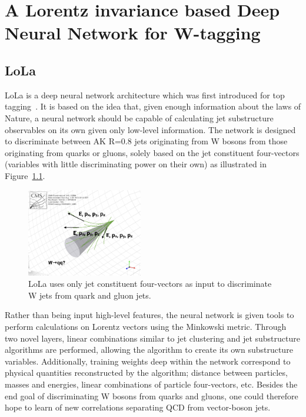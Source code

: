 \chapter{A Lorentz invariance based Deep Neural Network for W-tagging}
\section{LoLa}
LoLa is a deep neural network architecture which was first introduced for top tagging~\cite{Butter:2017cot}. It is based on the idea that, given enough information about the laws of Nature, a neural network should be capable of calculating jet substructure observables on its own given only low-level information. The network is designed to discriminate between AK R=0.8 jets originating from W bosons from those originating from quarks or gluons, solely based on the jet constituent four-vectors (variables with little discriminating power on their own) as illustrated in Figure~\ref{fig:lola:4vec}.
\begin{figure}[h!]
\centering
\includegraphics[width=0.45\textwidth]{figures/vtagging/misc/4vec.png}
\caption{LoLa uses only jet constituent four-vectors as input to discriminate W jets from quark and gluon jets.}
\label{fig:lola:4vec}
\end{figure}
Rather than being input high-level features, the neural network is given tools to perform calculations on Lorentz vectors using the Minkowski metric. Through two novel layers, linear combinations similar to jet clustering and jet substructure algorithms are performed, allowing the algorithm to create its own substructure variables. Additionally, training weights deep within the network correspond to physical quantities reconstructed by the algorithm; distance between particles, masses and energies, linear combinations of particle four-vectors, etc.
Besides the end goal of discriminating W bosons from quarks and gluons, one could therefore hope to learn of new correlations separating QCD from vector-boson jets.

